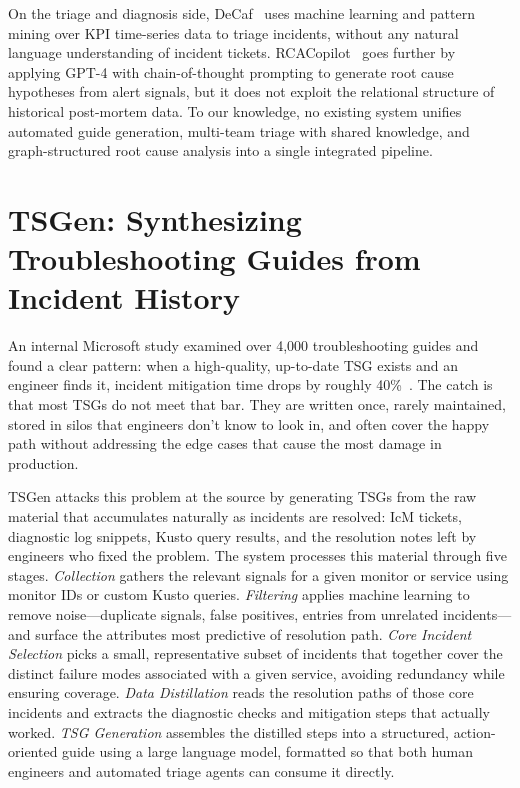 \documentclass[conference]{IEEEtran}
\begin{document}
On the triage and diagnosis side, DeCaf~\cite{decaf} uses machine learning and
pattern mining over KPI time-series data to triage incidents, without any natural
language understanding of incident tickets. RCACopilot~\cite{rcacopilot} goes
further by applying GPT-4 with chain-of-thought prompting to generate root cause
hypotheses from alert signals, but it does not exploit the relational structure
of historical post-mortem data. To our knowledge, no existing system unifies
automated guide generation, multi-team triage with shared knowledge, and
graph-structured root cause analysis into a single integrated pipeline.


\section{TSGen: Synthesizing Troubleshooting Guides from Incident History}

An internal Microsoft study examined over 4,000 troubleshooting guides and found
a clear pattern: when a high-quality, up-to-date TSG exists and an engineer finds
it, incident mitigation time drops by roughly 40\%~\cite{tsgen}. The catch is
that most TSGs do not meet that bar. They are written once, rarely maintained,
stored in silos that engineers don't know to look in, and often cover the happy
path without addressing the edge cases that cause the most damage in production.

TSGen attacks this problem at the source by generating TSGs from the raw material
that accumulates naturally as incidents are resolved: IcM tickets, diagnostic log
snippets, Kusto query results, and the resolution notes left by engineers who
fixed the problem. The system processes this material through five stages.
\textit{Collection} gathers the relevant signals for a given monitor or service
using monitor IDs or custom Kusto queries.
\textit{Filtering} applies machine learning to remove noise---duplicate signals,
false positives, entries from unrelated incidents---and surface the attributes
most predictive of resolution path.
\textit{Core Incident Selection} picks a small, representative subset of incidents
that together cover the distinct failure modes associated with a given service,
avoiding redundancy while ensuring coverage.
\textit{Data Distillation} reads the resolution paths of those core incidents and
extracts the diagnostic checks and mitigation steps that actually worked.
\textit{TSG Generation} assembles the distilled steps into a structured,
action-oriented guide using a large language model, formatted so that both human
engineers and automated triage agents can consume it directly.
\end{document}

